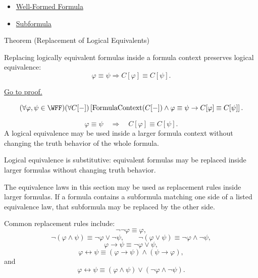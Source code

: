 \begin{dependencies}
\begin{itemize}
  \item \hyperref[def:well-formed-formula]{Well-Formed Formula}
  \item \hyperref[def:subformula-propositional-logic]{Subformula}
\end{itemize}
\end{dependencies}
\begin{theorembox}{Theorem (Replacement of Logical Equivalents)}
\begin{theorem}
\label{thm:replacement-of-logical-equivalents-propositional-logic}
Replacing logically equivalent formulas inside a formula context preserves logical equivalence:
\[
\varphi\equiv\psi
\Longrightarrow
C[\varphi]\equiv C[\psi].
\]

\noindent\hyperref[prf:replacement-of-logical-equivalents-propositional-logic]{Go to proof.}
\end{theorem}
\end{theorembox}

\begin{remark*}
\[
(\forall\varphi,\psi\in\WFF)
(\forall C[-])
\left[
\operatorname{FormulaContext}(C[-])
\land
\varphi\equiv\psi
\to
C[\varphi]\equiv C[\psi]
\right].
\]
\end{remark*}

\begin{remark*}
\[
\varphi\equiv\psi
\quad\Longrightarrow\quad
C[\varphi]\equiv C[\psi].
\]
A logical equivalence may be used inside a larger formula context without changing
the truth behavior of the whole formula.
\end{remark*}

\begin{remark*}[Interpretation]
Logical equivalence is substitutive: equivalent formulas may be replaced inside larger formulas without changing truth behavior.
\end{remark*}

\begin{remark*}[Exposition]
The equivalence laws in this section may be used as replacement rules inside
larger formulas. If a formula contains a subformula matching one side of a listed
equivalence law, that subformula may be replaced by the other side.

Common replacement rules include:
\[
\neg\neg\varphi \equiv \varphi,
\]
\[
\neg(\varphi\land\psi)\equiv \neg\varphi\lor\neg\psi,
\qquad
\neg(\varphi\lor\psi)\equiv \neg\varphi\land\neg\psi,
\]
\[
\varphi\to\psi\equiv \neg\varphi\lor\psi,
\]
\[
\varphi\leftrightarrow\psi
\equiv
(\varphi\to\psi)\land(\psi\to\varphi),
\]
and
\[
\varphi\leftrightarrow\psi
\equiv
(\varphi\land\psi)\lor(\neg\varphi\land\neg\psi).
\]
\end{remark*}

